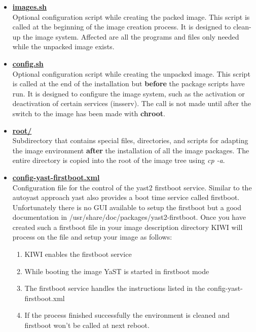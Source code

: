 \begin{itemize}
\item \textbf{\underline{images.sh}}\\
      Optional configuration script while creating the packed image.
      This script is called at the beginning of the image creation process.
      It is designed to clean-up the image system. Affected are all the
      programs and files only needed while the unpacked image exists.

\item \textbf{\underline{config.sh}}\\
      Optional configuration script while creating the unpacked image. This
      script is called at the end of the installation but \textbf{before}
      the package scripts have run. It is designed to configure the image
      system, such as the activation or deactivation of certain services
      (insserv). The call is not made until after the switch to the image
      has been made with \textbf{chroot}.

\item \textbf{\underline{root/}}\\
      Subdirectory that contains special files, directories, and scripts for
      adapting the image environment \textbf{after} the installation of all the
      image packages. The entire directory is copied into the root of the
      image tree using \textit{cp -a}.

\item \textbf{\underline{config-yast-firstboot.xml}}\\
      Configuration file for the control of the yast2 firstboot service.
      Similar to the autoyast approach yast also provides a boot time
      service called firstboot. Unfortunately there is no GUI available
      to setup the firstboot but a good documentation in
      /usr/share/doc/packages/yast2-firstboot. Once you have 
      created such a firstboot file in your image description directory KIWI
      will process on the file and setup your image as follows:

      \begin{enumerate}
      \item KIWI enables the firstboot service
      \item While booting the image YaST is started in firstboot mode
      \item The firstboot service handles the instructions listed in the
            config-yast-firstboot.xml
      \item If the process finished successfully the environment is
            cleaned and firstboot won't be called at next reboot.
      \end{enumerate} 


\end{itemize}
